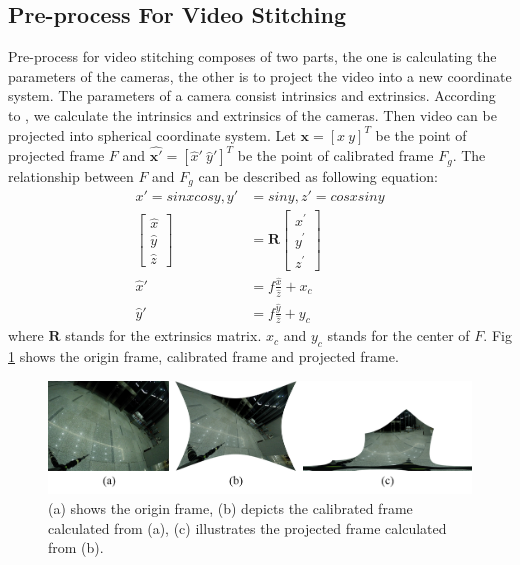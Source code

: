 \documentclass[conference]{IEEEtran}
\begin{document}
\subsection{Pre-process For Video Stitching}
\label{ssec:Pre-prepared}
Pre-process for video stitching composes of two parts, the one is calculating the parameters of the cameras, the other is to project the video into a new coordinate
system. The parameters of a camera consist intrinsics and extrinsics. 
According to \cite{zhang2000flexible}, we calculate the intrinsics and extrinsics of the cameras.
Then video can be projected into spherical coordinate system.
Let $\textbf{x} = [x \ y]^T$ be the point of projected frame $F$ and $\hat{\textbf{x}'} = [\hat{x}' \ \hat{y}']^T$ be the point of  calibrated frame $F_g$.
The relationship between $F$ and $F_g$ can be described as following equation:
\begin{equation}
\begin{aligned}
x'=sinxcosy, y'&=siny, z'=cosxsiny\\
\left[ \begin{array}{l}{\hat{x}} \\ {\hat{y}} \\ {\hat{z}}\end{array}\right]&=\textbf{R} \left[ \begin{array}{l}{x^{\prime}} \\ {y^{\prime}} \\ {z^{\prime}}\end{array}\right]\\
\hat{x}'&=f\frac{\hat{x}}{\hat{z}}+x_c\\
\hat{y}'&=f\frac{\hat{y}}{\hat{z}}+y_c
\end{aligned}
\end{equation}
where $\textbf{R}$ stands for the extrinsics matrix. $x_c$ and $y_c$ stands for the center of $F$.
Fig \ref{fig:ori_cal_pro} shows the origin frame, 
calibrated frame and projected frame. 

\begin{figure}[t]
\centering
\includegraphics[scale=0.23]{picture40.png}
\caption{(a) shows the origin frame, (b) depicts the calibrated frame calculated from (a), (c) illustrates the projected frame calculated from (b).}
\label{fig:ori_cal_pro}
\end{figure}
\end{document}
